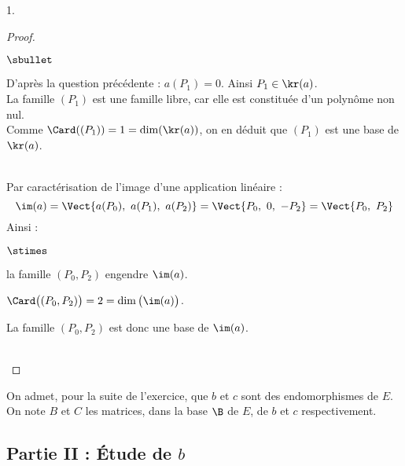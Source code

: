 \documentclass[11pt]{article}%
\begin{document}
\begin{noliste}{1.}
\begin{proof}
\begin{noliste}{$\sbullet$}


      \noindent
      D'après la question précédente : $a(P_1) = 0$. Ainsi $P_1 \in
      \kr(a)$. \\
      La famille $(P_1)$ est une famille libre, car elle est
      constituée d'un polynôme non nul.\\
      Comme $\Card( (P_1) ) = 1 = \dim(\kr(a))$, on en déduit que
      $(P_1)$ est une base de $\kr(a)$.\\[-.2cm] %
      ~\\[-.6cm]
      
    \item Par caractérisation de l'image d'une application linéaire :
      \[
      \im(a) =\Vect{a(P_0), \ a(P_1), \ a(P_2)} = \Vect{P_0, \ 0, \ -P_2}
      = \Vect{P_0, \ P_2}
      \]
      Ainsi :
      \begin{noliste}{$\stimes$}
      \item la famille $(P_0,P_2)$ engendre $\im(a)$.
      \item $\Card\big( (P_0,P_2) \big) = 2 = \dim\big( \im(a) \big)$.
      \end{noliste}
      La famille $(P_0,P_2)$ est donc une base de $\im(a)$. %
    \end{noliste}
    
    ~\\[-1.2cm]
  \end{proof}
  On admet, pour la suite de l'exercice, que $b$ et $c$ sont des
  endomorphismes de $E$.\\
  On note $B$ et $C$ les matrices, dans la base $\B$ de $E$, de $b$ et
  $c$ respectivement.
\end{noliste}




\subsection*{Partie II : Étude de $b$}
\end{document}
